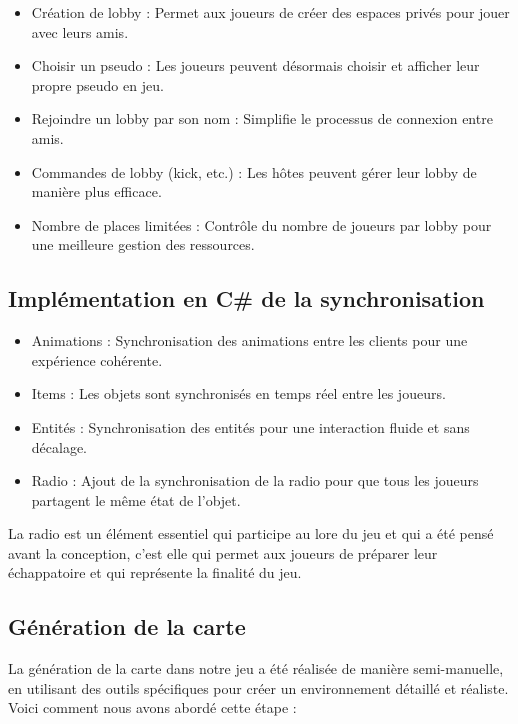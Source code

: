 \documentclass[
	article,			%
	11pt,				%
	oneside,			%
	a4paper,			%
	chapter=TITLE,
	french,			%
	sumario=tradicional
	]{base_nt}
\begin{document}
\begin{itemize}
    \item Création de lobby : Permet aux joueurs de créer des espaces privés pour jouer avec leurs amis.
    \item Choisir un pseudo : Les joueurs peuvent désormais choisir et afficher leur propre pseudo en jeu.
    \item Rejoindre un lobby par son nom : Simplifie le processus de connexion entre amis.
    \item Commandes de lobby (kick, etc.) : Les hôtes peuvent gérer leur lobby de manière plus efficace.
    \item Nombre de places limitées : Contrôle du nombre de joueurs par lobby pour une meilleure gestion des ressources.
\end{itemize}

\subsection{Implémentation en C\# de la synchronisation}

\begin{itemize}
    \item Animations : Synchronisation des animations entre les clients pour une expérience cohérente.
    \item Items : Les objets sont synchronisés en temps réel entre les joueurs.
    \item Entités : Synchronisation des entités pour une interaction fluide et sans décalage.
    \item Radio : Ajout de la synchronisation de la radio pour que tous les joueurs partagent le même état de l'objet.
\end{itemize}

La radio est un élément essentiel qui participe au lore du jeu et qui a été pensé avant la conception, c'est elle qui permet aux joueurs de préparer leur échappatoire et qui représente la finalité du jeu.

\newpage

\subsection{Génération de la carte}

La génération de la carte dans notre jeu a été réalisée de manière semi-manuelle, en utilisant des outils spécifiques pour créer un environnement détaillé et réaliste. Voici comment nous avons abordé cette étape :
\end{document}
